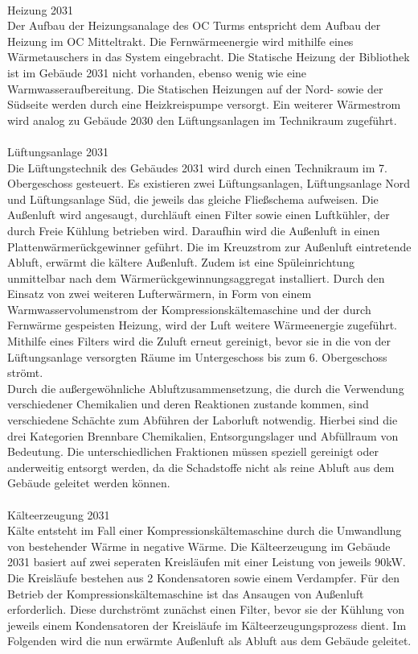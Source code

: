 \\
Heizung 2031\\
Der Aufbau der Heizungsanalage des OC Turms entspricht dem Aufbau der Heizung im OC Mitteltrakt. Die Fernwärmeenergie wird mithilfe eines Wärmetauschers in das System eingebracht. Die Statische Heizung der Bibliothek ist im Gebäude 2031 nicht vorhanden, ebenso wenig wie eine Warmwasseraufbereitung. Die Statischen Heizungen auf der Nord- sowie der Südseite werden durch eine Heizkreispumpe versorgt. Ein weiterer Wärmestrom wird analog zu Gebäude 2030 den Lüftungsanlagen im Technikraum zugeführt.\\
\\
Lüftungsanlage 2031\\
Die Lüftungstechnik des Gebäudes 2031 wird durch einen Technikraum im 7. Obergeschoss gesteuert.  Es existieren zwei Lüftungsanlagen, Lüftungsanlage Nord und Lüftungsanlage Süd, die jeweils das gleiche Fließschema aufweisen.
Die Außenluft wird angesaugt, durchläuft einen Filter sowie einen Luftkühler, der durch Freie Kühlung betrieben wird. Daraufhin wird die Außenluft in einen Plattenwärmerückgewinner geführt. Die im Kreuzstrom zur Außenluft eintretende Abluft, erwärmt die kältere Außenluft. Zudem ist eine Spüleinrichtung unmittelbar nach dem Wärmerückgewinnungsaggregat installiert. Durch den Einsatz von zwei weiteren Lufterwärmern, in Form von einem Warmwasservolumenstrom der Kompressionskältemaschine und der durch Fernwärme gespeisten Heizung, wird der Luft weitere Wärmeenergie zugeführt. Mithilfe eines Filters wird die Zuluft erneut gereinigt, bevor sie in die von der Lüftungsanlage versorgten Räume im Untergeschoss bis zum 6. Obergeschoss strömt.\\
Durch die außergewöhnliche Abluftzusammensetzung, die durch die Verwendung verschiedener Chemikalien und deren Reaktionen zustande kommen, sind verschiedene Schächte zum Abführen der Laborluft notwendig. Hierbei sind die drei Kategorien Brennbare Chemikalien, Entsorgungslager und Abfüllraum von Bedeutung. Die unterschiedlichen Fraktionen müssen speziell gereinigt oder anderweitig entsorgt werden, da die Schadstoffe nicht als reine Abluft aus dem Gebäude geleitet werden können. \\
\\
Kälteerzeugung 2031 \\
Kälte entsteht im Fall einer Kompressionskältemaschine durch die Umwandlung von bestehender Wärme in negative Wärme. Die Kälteerzeugung im Gebäude 2031 basiert auf zwei seperaten Kreisläufen mit einer Leistung von jeweils 90kW. Die Kreisläufe bestehen aus 2 Kondensatoren sowie einem Verdampfer. Für den Betrieb der Kompressionskältemaschine ist das Ansaugen von Außenluft erforderlich. Diese durchströmt zunächst einen Filter, bevor sie der Kühlung von jeweils einem Kondensatoren der Kreisläufe im Kälteerzeugungsprozess dient. Im Folgenden wird die nun erwärmte Außenluft als Abluft aus dem Gebäude geleitet.\\

